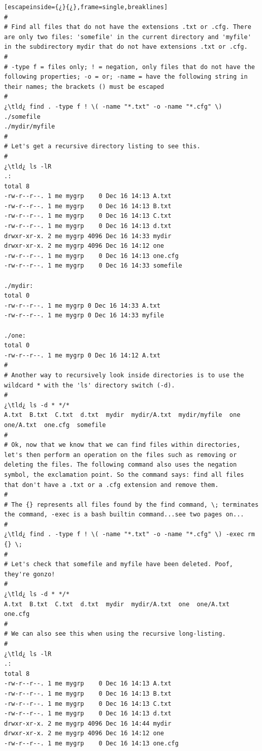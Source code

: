 \begin{lstlisting}[escapeinside={¿}{¿},frame=single,breaklines]
#
# Find all files that do not have the extensions .txt or .cfg. There are only two files: 'somefile' in the current directory and 'myfile' in the subdirectory mydir that do not have extensions .txt or .cfg. 
#
# -type f = files only; ! = negation, only files that do not have the following properties; -o = or; -name = have the following string in their names; the brackets () must be escaped 
#
¿\tld¿ find . -type f ! \( -name "*.txt" -o -name "*.cfg" \)
./somefile
./mydir/myfile
#
# Let's get a recursive directory listing to see this.
#
¿\tld¿ ls -lR
.:
total 8
-rw-r--r--. 1 me mygrp    0 Dec 16 14:13 A.txt
-rw-r--r--. 1 me mygrp    0 Dec 16 14:13 B.txt
-rw-r--r--. 1 me mygrp    0 Dec 16 14:13 C.txt
-rw-r--r--. 1 me mygrp    0 Dec 16 14:13 d.txt
drwxr-xr-x. 2 me mygrp 4096 Dec 16 14:33 mydir
drwxr-xr-x. 2 me mygrp 4096 Dec 16 14:12 one
-rw-r--r--. 1 me mygrp    0 Dec 16 14:13 one.cfg
-rw-r--r--. 1 me mygrp    0 Dec 16 14:33 somefile

./mydir:
total 0
-rw-r--r--. 1 me mygrp 0 Dec 16 14:33 A.txt
-rw-r--r--. 1 me mygrp 0 Dec 16 14:33 myfile

./one:
total 0
-rw-r--r--. 1 me mygrp 0 Dec 16 14:12 A.txt
#
# Another way to recursively look inside directories is to use the wildcard * with the 'ls' directory switch (-d).
#
¿\tld¿ ls -d * */*
A.txt  B.txt  C.txt  d.txt  mydir  mydir/A.txt  mydir/myfile  one  one/A.txt  one.cfg  somefile
#
# Ok, now that we know that we can find files within directories, let's then perform an operation on the files such as removing or deleting the files. The following command also uses the negation symbol, the exclamation point. So the command says: find all files that don't have a .txt or a .cfg extension and remove them.
#
# The {} represents all files found by the find command, \; terminates the command, -exec is a bash builtin command...see two pages on...
#
¿\tld¿ find . -type f ! \( -name "*.txt" -o -name "*.cfg" \) -exec rm {} \;
#
# Let's check that somefile and myfile have been deleted. Poof, they're gonzo!
#
¿\tld¿ ls -d * */*
A.txt  B.txt  C.txt  d.txt  mydir  mydir/A.txt  one  one/A.txt  one.cfg
#
# We can also see this when using the recursive long-listing.
#
¿\tld¿ ls -lR
.:
total 8
-rw-r--r--. 1 me mygrp    0 Dec 16 14:13 A.txt
-rw-r--r--. 1 me mygrp    0 Dec 16 14:13 B.txt
-rw-r--r--. 1 me mygrp    0 Dec 16 14:13 C.txt
-rw-r--r--. 1 me mygrp    0 Dec 16 14:13 d.txt
drwxr-xr-x. 2 me mygrp 4096 Dec 16 14:44 mydir
drwxr-xr-x. 2 me mygrp 4096 Dec 16 14:12 one
-rw-r--r--. 1 me mygrp    0 Dec 16 14:13 one.cfg


\end{lstlisting}
